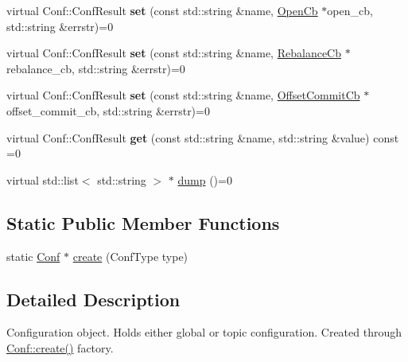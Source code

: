 \begin{DoxyCompactItemize}
\item 
\hypertarget{classRdKafka_1_1Conf_aa630f9ad61a88d261f0ddf6f91b5e2e9}{virtual Conf\-::\-Conf\-Result {\bfseries set} (const std\-::string \&name, \hyperlink{classRdKafka_1_1OpenCb}{Open\-Cb} $\ast$open\-\_\-cb, std\-::string \&errstr)=0}\label{classRdKafka_1_1Conf_aa630f9ad61a88d261f0ddf6f91b5e2e9}

\item 
\hypertarget{classRdKafka_1_1Conf_a6160e4cd43312a2fe1856f6aa671e92a}{virtual Conf\-::\-Conf\-Result {\bfseries set} (const std\-::string \&name, \hyperlink{classRdKafka_1_1RebalanceCb}{Rebalance\-Cb} $\ast$rebalance\-\_\-cb, std\-::string \&errstr)=0}\label{classRdKafka_1_1Conf_a6160e4cd43312a2fe1856f6aa671e92a}

\item 
\hypertarget{classRdKafka_1_1Conf_a1ad021fd3f4c374f5651435904b1a2dd}{virtual Conf\-::\-Conf\-Result {\bfseries set} (const std\-::string \&name, \hyperlink{classRdKafka_1_1OffsetCommitCb}{Offset\-Commit\-Cb} $\ast$offset\-\_\-commit\-\_\-cb, std\-::string \&errstr)=0}\label{classRdKafka_1_1Conf_a1ad021fd3f4c374f5651435904b1a2dd}

\item 
\hypertarget{classRdKafka_1_1Conf_af72e23916fb598c0b343a1235392a723}{virtual Conf\-::\-Conf\-Result {\bfseries get} (const std\-::string \&name, std\-::string \&value) const =0}\label{classRdKafka_1_1Conf_af72e23916fb598c0b343a1235392a723}

\item 
virtual std\-::list$<$ std\-::string $>$ $\ast$ \hyperlink{classRdKafka_1_1Conf_a873c2a3b90e05f99d68916f981096869}{dump} ()=0
\end{DoxyCompactItemize}
\subsection*{Static Public Member Functions}
\begin{DoxyCompactItemize}
\item 
static \hyperlink{classRdKafka_1_1Conf}{Conf} $\ast$ \hyperlink{classRdKafka_1_1Conf_a3b462e1852939d9f6fdc6f20a23a838d}{create} (Conf\-Type type)
\end{DoxyCompactItemize}


\subsection{Detailed Description}
Configuration object. Holds either global or topic configuration. Created through \hyperlink{classRdKafka_1_1Conf_a3b462e1852939d9f6fdc6f20a23a838d}{Conf\-::create()} factory. 

